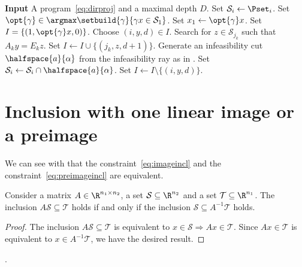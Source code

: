 \documentclass[11pt,twoside,a4paper,openright]{uclouvain-thesis}
\begin{document}
\begin{algorithm}[!ht]
  \caption{Solving a set program with polyhedral set variables and directional objective.}
  \label{algo:dirobj}
  \begin{algorithmic}
    \STATE \textbf{Input} A program~\eqref{eq:dirproj} and a maximal depth $D$.
    \STATE Set $\mathcal{S}_i \gets \Pset_i$.
    \REPEAT
      \STATE Set $\opt{\gamma} \in \argmax \setbuild{\gamma}{\gamma x \in \mathcal{S}_1}$.
      \STATE Set $x_1 \gets \opt{\gamma} x$.
      \STATE Set $I = \{(1, \opt{\gamma} x, 0)\}$.
        \STATE Choose $(i, y, d) \in I$.
              \STATE Search for $z \in \mathcal{S}_{j_k}$ such that $A_k y = E_k z$.
                \STATE Set $I \gets I \cup \{(j_k, z, d + 1)\}$.
              \ELSE
                \STATE Generate an infeasibility cut $\halfspace{a}{\alpha}$ from the infeasibility ray as in . %
                \STATE Set $\mathcal{S}_i \gets \mathcal{S}_i \cap \halfspace{a}{\alpha}$.
              \ENDIF
            \ENDIF
          \ENDFOR
        \ENDIF
        \STATE Set $I \gets I \setminus \{(i, y, d)\}$.
      \ENDWHILE
  \end{algorithmic}
\end{algorithm}

\section{Inclusion with one linear image or a preimage}
\label{sec:image}

We can see with  that the constraint~\eqref{eq:imageincl} and the constraint~\eqref{eq:preimageincl} are equivalent.

\begin{myprop}
  \label{prop:image}
  Consider a matrix $A \in \R^{n_1 \times n_2}$, a set $\mathcal{S} \subseteq \R^{n_2}$ and a set $\mathcal{T} \subseteq \R^{n_1}$.
  The inclusion $A\mathcal{S} \subseteq \mathcal{T}$ holds if and only if
  the inclusion $\mathcal{S} \subseteq A^{-1}\mathcal{T}$ holds.
  \begin{proof}
    The inclusion $A\mathcal{S} \subseteq \mathcal{T}$
    is equivalent to $x \in \mathcal{S} \Rightarrow Ax \in \mathcal{T}$.
    Since $Ax \in \mathcal{T}$ is equivalent to $x \in A^{-1}\mathcal{T}$,
    we have the desired result.
  \end{proof}.
\end{myprop}
\end{document}
